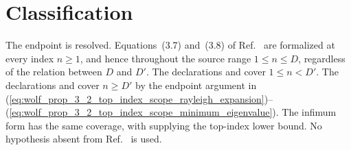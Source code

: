 \documentclass{article}
\begin{document}
\section{Classification}

The endpoint is resolved. Equations~(3.7) and~(3.8) of
Ref.~\cite{Wolf2012Quantum} are formalized at every index $n\geq1$, and hence
throughout the source range $1\leq n\leq D$, regardless of the relation between
$D$ and $D'$. The declarations
 and
 cover
$1\leq n<D'$. The declarations
 and
 cover $n\geq D'$ by
the endpoint argument in
(\ref{eq:wolf_prop_3_2_top_index_scope_rayleigh_expansion})--%
(\ref{eq:wolf_prop_3_2_top_index_scope_minimum_eigenvalue}). The infimum form
has the same coverage, with
 supplying the
top-index lower bound. No hypothesis absent from
Ref.~\cite{Wolf2012Quantum} is used.



\end{document}
